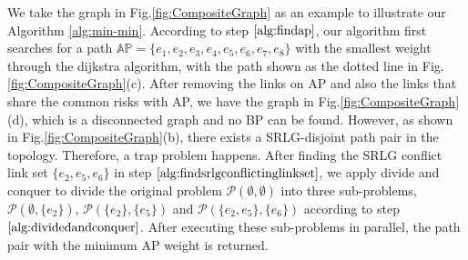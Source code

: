 We take the graph in Fig.\ref{fig:CompositeGraph} as an example to illustrate  our Algorithm \ref{alg:min-min}.
According to step $\ref{alg:findap}$, our  algorithm first searches for a path  $\mathbb{AP}=\{e_1,e_2,e_3,e_4,e_5,e_6,e_7,e_8\}$ with the smallest weight through the dijkstra algorithm, with the path shown as the dotted line in Fig.\ref{fig:CompositeGraph}(c). After removing the links on AP and also the links that share the common risks with AP, we have the graph in Fig.\ref{fig:CompositeGraph}(d), which is a disconnected graph and no BP can be found. %
However, as shown in Fig.\ref{fig:CompositeGraph}(b), there exists a SRLG-disjoint path pair in the topology. Therefore, a trap problem happens. After finding the SRLG conflict link set $\{e_2,e_5,e_6\}$ in step $\ref{alg:findsrlgconflictinglinkset}$, we apply divide and conquer to divide the original problem ${\mathcal P}(\emptyset ,\emptyset )$  into three sub-problems, ${\mathcal P}(\emptyset ,\{e_2\} )$, ${\mathcal P}(\{e_2\} ,\{e_5\} )$ and ${\mathcal P}(\{e_2,e_5\} ,\{e_6\} )$ according to step $\ref{alg:dividedandconquer}$. After executing these sub-problems in parallel, the path pair with the minimum AP weight is returned.



